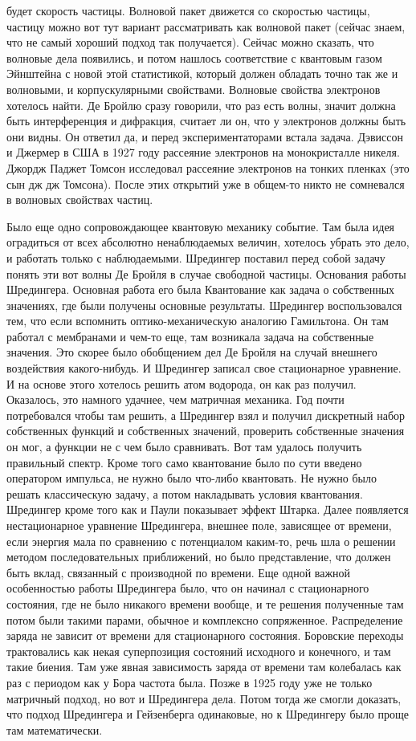 \documentclass[a4paper, 12pt]{article}
\begin{document}
будет скорость частицы. Волновой пакет движется со скоростью частицы, 
частицу можно вот тут вариант рассматривать как волновой пакет (сейчас 
знаем, что не самый хороший подход так получается). Сейчас можно 
сказать, что волновые дела появились, и потом нашлось соответствие 
с квантовым газом Эйнштейна с новой этой статистикой, который должен 
обладать точно так же и волновыми, и корпускулярными свойствами. 
Волновые свойства электронов хотелось найти. Де Бройлю сразу говорили, 
что раз есть волны, значит должна быть интерференция и дифракция, 
считает ли он, что у электронов должны быть они видны. Он ответил да, 
и перед экспериментаторами встала задача. Дэвиссон и Джермер в США 
в 1927 году рассеяние электронов на монокристалле никеля. Джордж Паджет 
Томсон исследовал рассеяние электронов на тонких пленках (это сын дж дж 
Томсона). После этих открытий уже в общем-то никто не сомневался 
в волновых свойствах частиц.

Было еще одно сопровождающее квантовую механику событие. Там была идея 
оградиться от всех абсолютно ненаблюдаемых величин, хотелось убрать это 
дело, и работать только с наблюдаемыми. Шредингер поставил перед собой 
задачу понять эти вот волны Де Бройля в случае свободной частицы. 
Основания работы Шредингера. Основная работа его была Квантование как 
задача о собственных значениях, где были получены основные результаты. 
Шредингер воспользовался тем, что если вспомнить оптико-механическую 
аналогию Гамильтона. Он там работал с мембранами и чем-то еще, там 
возникала задача на собственные значения. Это скорее было обобщением дел 
Де Бройля на случай внешнего воздействия какого-нибудь. И Шредингер 
записал свое стационарное уравнение. И на основе этого хотелось решить 
атом водорода, он как раз получил. Оказалось, это намного удачнее, чем 
матричная механика. Год почти потребовался чтобы там решить, а Шредингер 
взял и получил дискретный набор собственных функций и собственных 
значений, проверить собственные значения он мог, а функции не с чем было 
сравнивать. Вот там удалось получить правильный спектр. Кроме того само 
квантование было по сути введено оператором импульса, не нужно было 
что-либо квантовать. Не нужно было решать классическую задачу, а потом 
накладывать условия квантования. Шредингер кроме того как и Паули 
показывает эффект Штарка. Далее появляется нестационарное уравнение 
Шредингера, внешнее поле, зависящее от времени, если энергия мала по 
сравнению с потенциалом каким-то, речь шла о решении методом 
последовательных приближений, но было представление, что должен быть 
вклад, связанный с производной по времени. Еще одной важной особенностью 
работы Шредингера было, что он начинал с стационарного состояния, где не 
было никакого времени вообще, и те решения полученные там потом были 
такими парами, обычное и комплексно сопряженное. Распределение заряда не 
зависит от времени для стационарного состояния. Боровские переходы 
трактовались как некая суперпозиция состояний исходного и конечного, 
и там такие биения. Там уже явная зависимость заряда от времени там 
колебалась как раз с периодом как у Бора частота была. Позже в 1925 году 
уже не только матричный подход, но вот и Шредингера дела. Потом тогда же 
смогли доказать, что подход Шредингера и Гейзенберга одинаковые, но 
к Шредингеру было проще там математически.
\end{document}
